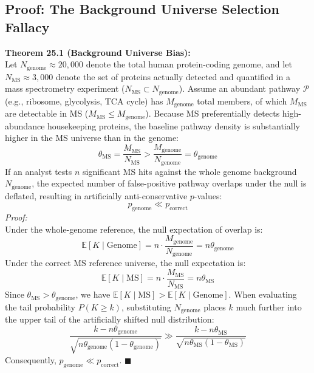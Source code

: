 \documentclass[11pt,twoside,openright]{book}
\begin{document}
\subsection{Proof: The Background Universe Selection Fallacy}

\begin{svgraybox}
\textbf{Theorem 25.1 (Background Universe Bias):}\\
Let $N_{\text{genome}} \approx 20,000$ denote the total human protein-coding genome, and let $N_{\text{MS}} \approx 3,000$ denote the set of proteins actually detected and quantified in a mass spectrometry experiment ($N_{\text{MS}} \subset N_{\text{genome}}$). Assume an abundant pathway $\mathcal{P}$ (e.g., ribosome, glycolysis, TCA cycle) has $M_{\text{genome}}$ total members, of which $M_{\text{MS}}$ are detectable in MS ($M_{\text{MS}} \le M_{\text{genome}}$). Because MS preferentially detects high-abundance housekeeping proteins, the baseline pathway density is substantially higher in the MS universe than in the genome:
\begin{equation}
\theta_{\text{MS}} = \frac{M_{\text{MS}}}{N_{\text{MS}}} > \frac{M_{\text{genome}}}{N_{\text{genome}}} = \theta_{\text{genome}}
\end{equation}
If an analyst tests $n$ significant MS hits against the whole genome background $N_{\text{genome}}$, the expected number of false-positive pathway overlaps under the null is deflated, resulting in artificially anti-conservative $p$-values:
\begin{equation}
p_{\text{genome}} \ll p_{\text{correct}}
\end{equation}
\textit{Proof:}\\
Under the whole-genome reference, the null expectation of overlap is:
\begin{equation*}
\mathbb{E}[K \mid \text{Genome}] = n \cdot \frac{M_{\text{genome}}}{N_{\text{genome}}} = n \theta_{\text{genome}}
\end{equation*}
Under the correct MS reference universe, the null expectation is:
\begin{equation*}
\mathbb{E}[K \mid \text{MS}] = n \cdot \frac{M_{\text{MS}}}{N_{\text{MS}}} = n \theta_{\text{MS}}
\end{equation*}
Since $\theta_{\text{MS}} > \theta_{\text{genome}}$, we have $\mathbb{E}[K \mid \text{MS}] > \mathbb{E}[K \mid \text{Genome}]$. When evaluating the tail probability $P(K \ge k)$, substituting $N_{\text{genome}}$ places $k$ much further into the upper tail of the artificially shifted null distribution:
\begin{equation*}
\frac{k - n\theta_{\text{genome}}}{\sqrt{n \theta_{\text{genome}}(1 - \theta_{\text{genome}})}} \gg \frac{k - n\theta_{\text{MS}}}{\sqrt{n \theta_{\text{MS}}(1 - \theta_{\text{MS}})}}
\end{equation*}
Consequently, $p_{\text{genome}} \ll p_{\text{correct}}$. \hfill $\blacksquare$
\end{svgraybox}
\end{document}
